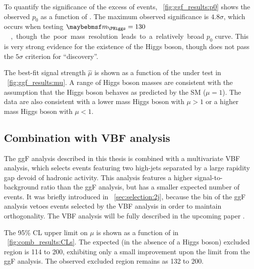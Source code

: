 To quantify the significance of the excess of events, \Figure~\ref{fig:ggf_results:p0} shows 
the observed $p_0$ as a function of \mH. The maximum observed significance is $4.8\sigma$, 
which occurs when testing \unit{$\mH = 130$}{\GeV}, though the poor mass resolution leads to 
a relatively broad $p_0$ curve. This is very strong evidence for the existence of the Higgs 
boson, though does not pass the $5\sigma$ criterion for ``discovery''.

The best-fit signal strength $\hat{\mu}$ is shown as a function of the \mH under test in 
\Figure~\ref{fig:ggf_results:mu}. A range of Higgs boson masses are consistent with the 
assumption that the Higgs boson behaves as predicted by the SM (\ie $\mu = 1$). The data 
are also consistent with a lower mass Higgs boson with $\mu > 1$ or a higher mass Higgs 
boson with $\mu < 1$. 



\subsection{Combination with VBF analysis}
\label{sec:results:combined_limits}

The ggF analysis described in this thesis is combined with a multivariate VBF analysis, 
which selects events featuring two high-\pt jets separated by a large rapidity gap devoid of 
hadronic activity. This analysis features a higher signal-to-background ratio than the ggF 
analysis, but has a smaller expected number of events. It was briefly introduced in 
\Section~\ref{sec:selection:2j}, because the \twojet bin of the ggF analysis vetoes events 
selected by the VBF analysis in order to maintain orthogonality. The VBF analysis will be 
fully described in the upcoming paper \cite{HWW-RunI}.

The 95\% CL upper limit on $\mu$ is shown as a function of \mH in 
\Figure~\ref{fig:comb_results:CLs}. The expected (in the absence of a Higgs boson) excluded 
region is \unit{114}{\GeV} to \unit{200}{\GeV}, exhibiting only a small improvement upon the 
limit from the ggF analysis. The observed excluded region remains as \unit{132}{\GeV} to 
\unit{200}{\GeV}.


